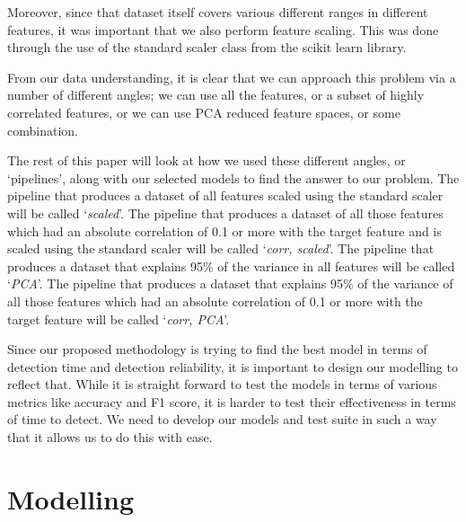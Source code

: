 Moreover, since that dataset itself covers various different ranges in different features, it was important that we also perform feature scaling. This was done through the use of the standard scaler class from the scikit learn library.

From our data understanding, it is clear that we can approach this problem via a number of different angles; we can use all the features, or a subset of highly correlated features, or we can use PCA reduced feature spaces, or some combination. 

The rest of this paper will look at how we used these different angles, or `pipelines', along with our selected models to find the answer to our problem. The pipeline that produces a dataset of all features scaled using the standard scaler will be called `\textit{scaled}'. The pipeline that produces a dataset of all those features which had an absolute correlation of 0.1 or more with the target feature and is scaled using the standard scaler will be called `\textit{corr, scaled}'. The pipeline that produces a dataset that explains 95\% of the variance in all features will be called `\textit{PCA}'. The pipeline that produces a dataset that explains 95\% of the variance of all those features which had an absolute correlation of 0.1 or more with the target feature will be called `\textit{corr, PCA}'.

Since our proposed methodology is trying to find the best model in terms of detection time and detection reliability, it is important to design our modelling to reflect that. While it is straight forward to test the models in terms of various metrics like accuracy and F1 score, it is harder to test their effectiveness in terms of time to detect. We need to develop our models and test suite in such a way that it allows us to do this with ease.




\section{Modelling}

